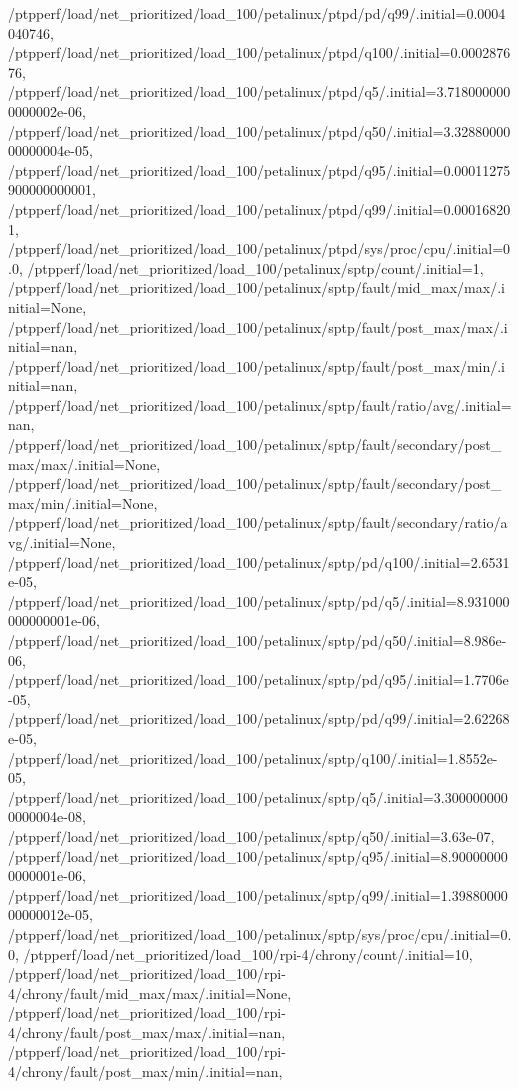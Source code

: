 {    /ptpperf/load/net_prioritized/load_100/petalinux/ptpd/pd/q99/.initial=0.0004040746,
    /ptpperf/load/net_prioritized/load_100/petalinux/ptpd/q100/.initial=0.000287676,
    /ptpperf/load/net_prioritized/load_100/petalinux/ptpd/q5/.initial=3.7180000000000002e-06,
    /ptpperf/load/net_prioritized/load_100/petalinux/ptpd/q50/.initial=3.3288000000000004e-05,
    /ptpperf/load/net_prioritized/load_100/petalinux/ptpd/q95/.initial=0.00011275900000000001,
    /ptpperf/load/net_prioritized/load_100/petalinux/ptpd/q99/.initial=0.000168201,
    /ptpperf/load/net_prioritized/load_100/petalinux/ptpd/sys/proc/cpu/.initial=0.0,
    /ptpperf/load/net_prioritized/load_100/petalinux/sptp/count/.initial=1,
    /ptpperf/load/net_prioritized/load_100/petalinux/sptp/fault/mid_max/max/.initial=None,
    /ptpperf/load/net_prioritized/load_100/petalinux/sptp/fault/post_max/max/.initial=nan,
    /ptpperf/load/net_prioritized/load_100/petalinux/sptp/fault/post_max/min/.initial=nan,
    /ptpperf/load/net_prioritized/load_100/petalinux/sptp/fault/ratio/avg/.initial=nan,
    /ptpperf/load/net_prioritized/load_100/petalinux/sptp/fault/secondary/post_max/max/.initial=None,
    /ptpperf/load/net_prioritized/load_100/petalinux/sptp/fault/secondary/post_max/min/.initial=None,
    /ptpperf/load/net_prioritized/load_100/petalinux/sptp/fault/secondary/ratio/avg/.initial=None,
    /ptpperf/load/net_prioritized/load_100/petalinux/sptp/pd/q100/.initial=2.6531e-05,
    /ptpperf/load/net_prioritized/load_100/petalinux/sptp/pd/q5/.initial=8.931000000000001e-06,
    /ptpperf/load/net_prioritized/load_100/petalinux/sptp/pd/q50/.initial=8.986e-06,
    /ptpperf/load/net_prioritized/load_100/petalinux/sptp/pd/q95/.initial=1.7706e-05,
    /ptpperf/load/net_prioritized/load_100/petalinux/sptp/pd/q99/.initial=2.62268e-05,
    /ptpperf/load/net_prioritized/load_100/petalinux/sptp/q100/.initial=1.8552e-05,
    /ptpperf/load/net_prioritized/load_100/petalinux/sptp/q5/.initial=3.3000000000000004e-08,
    /ptpperf/load/net_prioritized/load_100/petalinux/sptp/q50/.initial=3.63e-07,
    /ptpperf/load/net_prioritized/load_100/petalinux/sptp/q95/.initial=8.900000000000001e-06,
    /ptpperf/load/net_prioritized/load_100/petalinux/sptp/q99/.initial=1.3988000000000012e-05,
    /ptpperf/load/net_prioritized/load_100/petalinux/sptp/sys/proc/cpu/.initial=0.0,
    /ptpperf/load/net_prioritized/load_100/rpi-4/chrony/count/.initial=10,
    /ptpperf/load/net_prioritized/load_100/rpi-4/chrony/fault/mid_max/max/.initial=None,
    /ptpperf/load/net_prioritized/load_100/rpi-4/chrony/fault/post_max/max/.initial=nan,
    /ptpperf/load/net_prioritized/load_100/rpi-4/chrony/fault/post_max/min/.initial=nan,
}
